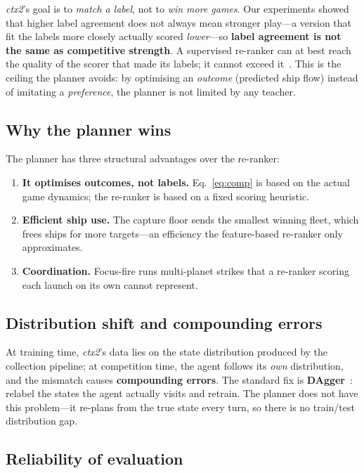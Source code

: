 \documentclass[conference]{IEEEtran}
\begin{document}
\textit{ctx2}'s goal is to \emph{match a label}, not to \emph{win more games}. Our experiments showed that higher label agreement does not always mean stronger play---a version that fit the labels more closely actually scored \emph{lower}---so \textbf{label agreement is not the same as competitive strength}. A supervised re-ranker can at best reach the quality of the scorer that made its labels; it cannot exceed it~\cite{imitation_survey2017}. This is the ceiling the planner avoids: by optimising an \emph{outcome} (predicted ship flow) instead of imitating a \emph{preference}, the planner is not limited by any teacher.

\subsection{Why the planner wins}

The planner has three structural advantages over the re-ranker:
\begin{enumerate}
\item \textbf{It optimises outcomes, not labels.} Eq.~\eqref{eq:comp} is based on the actual game dynamics; the re-ranker is based on a fixed scoring heuristic.
\item \textbf{Efficient ship use.} The capture floor sends the smallest winning fleet, which frees ships for more targets---an efficiency the feature-based re-ranker only approximates.
\item \textbf{Coordination.} Focus-fire runs multi-planet strikes that a re-ranker scoring each launch on its own cannot represent.
\end{enumerate}

\subsection{Distribution shift and compounding errors}

At training time, \textit{ctx2}'s data lies on the state distribution produced by the collection pipeline; at competition time, the agent follows its \emph{own} distribution, and the mismatch causes \textbf{compounding errors}. The standard fix is \textbf{DAgger}~\cite{dagger2011}: relabel the states the agent actually visits and retrain. The planner does not have this problem---it re-plans from the true state every turn, so there is no train/test distribution gap.

\subsection{Reliability of evaluation}
\end{document}
